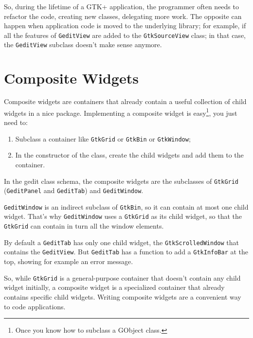 So, during the lifetime of a GTK+ application, the programmer often needs to refactor the code, creating new classes, delegating more work. The opposite can happen when application code is moved to the underlying library; for example, if all the features of \lstinline{GeditView} are added to the \lstinline{GtkSourceView} class; in that case, the \lstinline{GeditView} subclass doesn't make sense anymore.

\section{Composite Widgets}

Composite widgets are containers that already contain a useful collection of child widgets in a nice package. Implementing a composite widget is easy\footnote{Once you know how to subclass a GObject class.}, you just need to:
\begin{enumerate}
  \item Subclass a container like \lstinline{GtkGrid} or \lstinline{GtkBin} or \lstinline{GtkWindow};
  \item In the constructor of the class, create the child widgets and add them to the container.
\end{enumerate}

In the gedit class schema, the composite widgets are the subclasses of \lstinline{GtkGrid} (\lstinline{GeditPanel} and \lstinline{GeditTab}) and \lstinline{GeditWindow}.

\lstinline{GeditWindow} is an indirect subclass of \lstinline{GtkBin}, so it can contain at most one child widget. That's why \lstinline{GeditWindow} uses a \lstinline{GtkGrid} as its child widget, so that the \lstinline{GtkGrid} can contain in turn all the window elements.

By default a \lstinline{GeditTab} has only one child widget, the \lstinline{GtkScrolledWindow} that contains the \lstinline{GeditView}. But \lstinline{GeditTab} has a function to add a \lstinline{GtkInfoBar} at the top, showing for example an error message.

So, while \lstinline{GtkGrid} is a general-purpose container that doesn't contain any child widget initially, a composite widget is a specialized container that already contains specific child widgets. Writing composite widgets are a convenient way to code applications.

